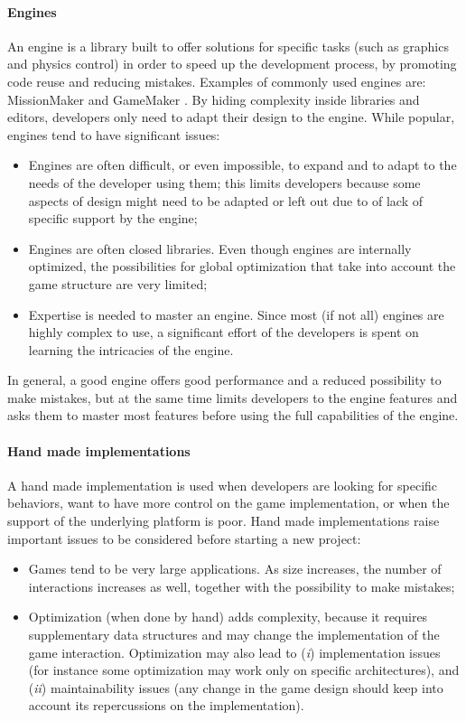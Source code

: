 \paragraph{Engines} An engine is a library built to offer solutions for specific tasks (such as graphics and physics control) in order to speed up the development process, by promoting code reuse and reducing mistakes. Examples of commonly used engines are: MissionMaker \cite{MissionMaker} and GameMaker \cite{GameMaker}. By hiding complexity inside libraries and editors, developers only need to adapt their design to the engine. While popular, engines tend to have significant issues:
\begin{itemize}
\item Engines are often difficult, or even impossible, to expand and to adapt to the needs of the developer using them; this limits developers because some aspects of design might need to be adapted or left out due to of lack of specific support by the engine;
\item Engines are often closed libraries. Even though engines are internally optimized, the possibilities for global optimization that take into account the game structure are very limited;
\item Expertise is needed to master an engine. Since most (if not all) engines are highly complex to use, a significant effort of the developers is spent on learning the intricacies of the engine.
\end{itemize}
In general, a good engine offers good performance and a reduced possibility to make mistakes, but at the same time limits developers to the engine features and asks them to master most features before using the full capabilities of the engine.

\paragraph{Hand made implementations} A hand made implementation is used when developers are looking for specific behaviors, want to have more control on the game implementation, or when the support of the underlying platform is poor.
Hand made implementations raise important issues to be considered before starting a new project:
\begin{itemize}
\item Games tend to be very large applications. As size increases, the number of interactions increases as well, together with the possibility to make mistakes;
\item Optimization (when done by hand) adds complexity, because it requires supplementary data structures and may change the implementation of the game interaction. Optimization may also lead to (\textit{i}) implementation issues (for instance some optimization may work only on specific architectures), and (\textit{ii}) maintainability issues (any change in the game design should keep into account its repercussions on the implementation).
\end{itemize}


